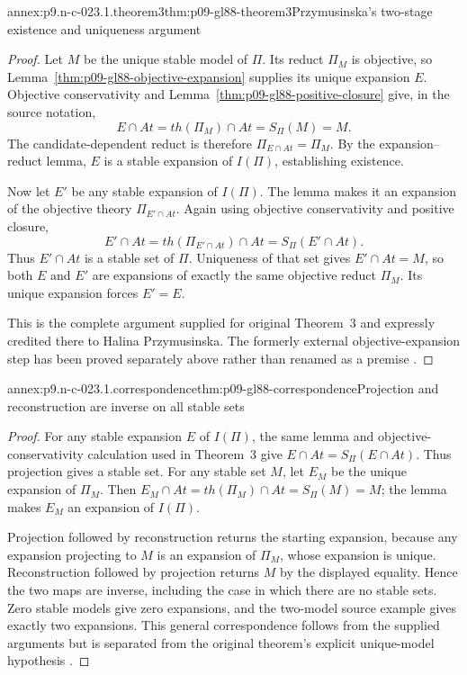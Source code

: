 \begin{annexitem}{annex:p9.n-c-023.1.theorem3}{thm:p09-gl88-theorem3}{Przymusinska's two-stage existence and uniqueness argument}
\begin{proof}
Let \(M\) be the unique stable model of \(\Pi\).  Its reduct \(\Pi_M\)
is objective, so Lemma~\ref{thm:p09-gl88-objective-expansion} supplies
its unique expansion \(E\).  Objective conservativity and
Lemma~\ref{thm:p09-gl88-positive-closure} give, in the source notation,
\[
 E\cap At=th(\Pi_M)\cap At=S_\Pi(M)=M.
\]
The candidate-dependent reduct is therefore
\(\Pi_{E\cap At}=\Pi_M\).  By the expansion--reduct lemma, \(E\)
is a stable expansion of \(I(\Pi)\), establishing existence.

Now let \(E'\) be any stable expansion of \(I(\Pi)\).  The lemma
makes it an expansion of the objective theory \(\Pi_{E'\cap At}\).
Again using objective conservativity and positive closure,
\[
 E'\cap At=th(\Pi_{E'\cap At})\cap At
          =S_\Pi(E'\cap At).
\]
Thus \(E'\cap At\) is a stable set of \(\Pi\).  Uniqueness of that
set gives \(E'\cap At=M\), so both \(E\) and \(E'\) are expansions
of exactly the same objective reduct \(\Pi_M\).  Its unique expansion
forces \(E'=E\).

This is the complete argument supplied for original Theorem~3 and expressly
credited there to Halina Przymusinska.  The formerly external
objective-expansion step has been proved separately above rather than
renamed as a premise \cite[\S4, pp.~8--9]{GelfondLifschitz1988}.
\end{proof}
\end{annexitem}

\begin{annexitem}{annex:p9.n-c-023.1.correspondence}{thm:p09-gl88-correspondence}{Projection and reconstruction are inverse on all stable sets}
\begin{proof}
For any stable expansion \(E\) of \(I(\Pi)\), the same lemma and
objective-conservativity calculation used in Theorem~3 give
\(E\cap At=S_\Pi(E\cap At)\).  Thus projection gives a stable set.
For any stable set \(M\), let \(E_M\) be the unique expansion of
\(\Pi_M\).  Then
\(E_M\cap At=th(\Pi_M)\cap At=S_\Pi(M)=M\); the lemma makes
\(E_M\) an expansion of \(I(\Pi)\).

Projection followed by reconstruction returns the starting expansion,
because any expansion projecting to \(M\) is an expansion of
\(\Pi_M\), whose expansion is unique.  Reconstruction followed by
projection returns \(M\) by the displayed equality.  Hence the two maps
are inverse, including the case in which there are no stable sets.
Zero stable models give zero expansions, and the two-model source example
gives exactly two expansions.  This general correspondence follows from
the supplied arguments but is separated from the original theorem's
explicit unique-model hypothesis \cite[\S4, pp.~8--9]{GelfondLifschitz1988}.
\end{proof}
\end{annexitem}
